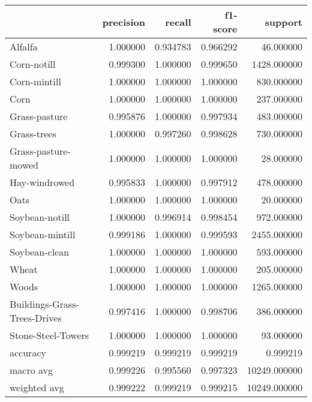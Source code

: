 \begin{tabular}{lrrrr}
\toprule
{} &  precision &    recall &  f1-score &       support \\
\midrule
Alfalfa                      &   1.000000 &  0.934783 &  0.966292 &     46.000000 \\
Corn-notill                  &   0.999300 &  1.000000 &  0.999650 &   1428.000000 \\
Corn-mintill                 &   1.000000 &  1.000000 &  1.000000 &    830.000000 \\
Corn                         &   1.000000 &  1.000000 &  1.000000 &    237.000000 \\
Grass-pasture                &   0.995876 &  1.000000 &  0.997934 &    483.000000 \\
Grass-trees                  &   1.000000 &  0.997260 &  0.998628 &    730.000000 \\
Grass-pasture-mowed          &   1.000000 &  1.000000 &  1.000000 &     28.000000 \\
Hay-windrowed                &   0.995833 &  1.000000 &  0.997912 &    478.000000 \\
Oats                         &   1.000000 &  1.000000 &  1.000000 &     20.000000 \\
Soybean-notill               &   1.000000 &  0.996914 &  0.998454 &    972.000000 \\
Soybean-mintill              &   0.999186 &  1.000000 &  0.999593 &   2455.000000 \\
Soybean-clean                &   1.000000 &  1.000000 &  1.000000 &    593.000000 \\
Wheat                        &   1.000000 &  1.000000 &  1.000000 &    205.000000 \\
Woods                        &   1.000000 &  1.000000 &  1.000000 &   1265.000000 \\
Buildings-Grass-Trees-Drives &   0.997416 &  1.000000 &  0.998706 &    386.000000 \\
Stone-Steel-Towers           &   1.000000 &  1.000000 &  1.000000 &     93.000000 \\
accuracy                     &   0.999219 &  0.999219 &  0.999219 &      0.999219 \\
macro avg                    &   0.999226 &  0.995560 &  0.997323 &  10249.000000 \\
weighted avg                 &   0.999222 &  0.999219 &  0.999215 &  10249.000000 \\
\bottomrule
\end{tabular}
